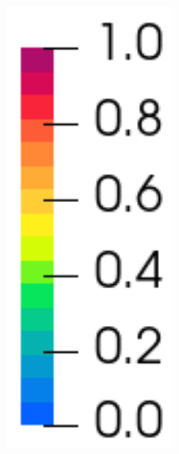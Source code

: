 \begin{figure}[!htb]
\begin{subfigure}[b]{0.1\textwidth}
    \includegraphics[width=0.6\textwidth]{Chapter5/figures/spallation/colorbar_d_seed}
    \vspace{4em}
  \end{subfigure}
  

\end{figure}
